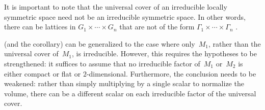  It is important to note that the universal cover of an irreducible
locally symmetric space need not be an irreducible symmetric space.
In other words, there can be lattices in $G_1 \times \cdots \times
G_n$ that are not of the form $\Gamma_1 \times \cdots \times
\Gamma_n$ . 

\begin{rem}
 (and the corollary) can be generalized to the case where
only~$M_1$, rather than the universal cover of~$M_1$, is irreducible.
However, this requires the hypotheses to be strengthened: it
suffices to assume that no irreducible factor of~$M_1$ or~$M_2$ is
either compact or flat or $2$-dimensional. Furthermore, the conclusion needs to be weakened:
rather than simply multiplying by a single scalar to normalize
the volume, there can be a
different scalar on each irreducible factor of the universal cover.
\end{rem}

